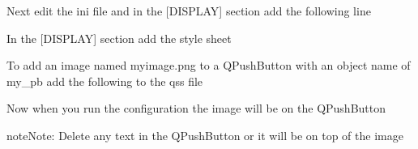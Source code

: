 \documentclass[letterpaper,10pt,english]{sphinxmanual}
\begin{document}
\sphinxAtStartPar
Next edit the ini file and in the {[}DISPLAY{]} section add the following line

\begin{sphinxVerbatim}[commandchars=\\\{\}]
  
\end{sphinxVerbatim}

\sphinxAtStartPar
In the {[}DISPLAY{]} section add the style sheet

\begin{sphinxVerbatim}[commandchars=\\\{\}]
  
\end{sphinxVerbatim}

\sphinxAtStartPar
To add an image named my\sphinxhyphen{}image.png to a QPushButton with an object name of
my\_pb add the following to the qss file

\begin{sphinxVerbatim}[commandchars=\\\{\}]
         
         
         
         
         
         
         
         
\end{sphinxVerbatim}

\sphinxAtStartPar
Now when you run the configuration the image will be on the QPushButton


\begin{sphinxadmonition}{note}{Note:}
\sphinxAtStartPar
Delete any text in the QPushButton or it will be on top of the image
\end{sphinxadmonition}



\renewcommand{\indexname}{Index}
\printindex
\end{document}
